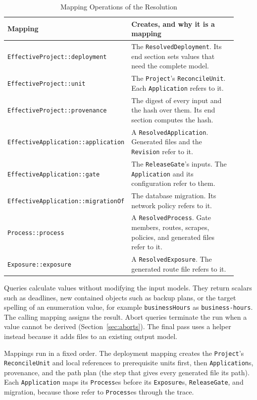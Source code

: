 \begin{table}[!htbp]
\centering
\begin{tabular}{>{\raggedright\arraybackslash}p{0.33\linewidth}>{\raggedright\arraybackslash}p{0.59\linewidth}}
\hline
\textbf{Mapping} & \textbf{Creates, and why it is a mapping} \\
\hline
\texttt{EffectiveProject::\allowbreak deployment} & The \texttt{ResolvedDeployment}. Its end section sets values that need the complete model. \\
\texttt{EffectiveProject::\allowbreak unit} & The \texttt{Project}'s \texttt{ReconcileUnit}. Each \texttt{Application} refers to it. \\
\texttt{EffectiveProject::\allowbreak provenance} & The digest of every input and the hash over them. Its end section computes the hash. \\
\texttt{EffectiveApplication::\allowbreak application} & A \texttt{ResolvedApplication}. Generated files and the \texttt{Revision} refer to it. \\
\texttt{EffectiveApplication::\allowbreak gate} & The \texttt{ReleaseGate}'s inputs. The \texttt{Application} and its configuration refer to them. \\
\texttt{EffectiveApplication::\allowbreak migrationOf} & The database migration. Its network policy refers to it. \\
\texttt{Process::process} & A \texttt{ResolvedProcess}. Gate members, routes, scrapes, policies, and generated files refer to it. \\
\texttt{Exposure::exposure} & A \texttt{ResolvedExposure}. The generated route file refers to it. \\
\hline
\end{tabular}
\caption{Mapping Operations of the Resolution}
\label{tab:mappings}
\end{table}

Queries calculate values without modifying the input models. They return
scalars such as deadlines, new contained objects such as backup plans, or
the target spelling of an enumeration value, for example
\texttt{businessHours} as \texttt{business-hours}. The calling mapping
assigns the result. Abort queries terminate the run when a value cannot be
derived (Section~\ref{sec:aborts}). The final pass uses a helper instead
because it adds files to an existing output model.

Mappings run in a fixed order. The deployment mapping creates the
\texttt{Project}'s \texttt{ReconcileUnit} and local references to prerequisite
units first, then \texttt{Application}s, provenance, and the path plan (the step
that gives every generated file its path). Each \texttt{Application} maps
its \texttt{Process}es before its \texttt{Exposure}s, \texttt{ReleaseGate}, and migration, because those
refer to \texttt{Process}es through the trace.

